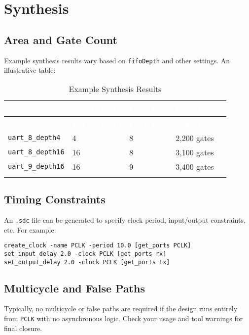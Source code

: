 \section{Synthesis}

\subsection{Area and Gate Count}
Example synthesis results vary based on \texttt{fifoDepth} and other settings. An illustrative table:

\renewcommand*{\arraystretch}{1.3}
\begingroup
\small
{}
\begin{longtable}[H]{
  | p{}
  | p{}
  | p{}
  | p{} |
}
\hline
\rowcolor{gray}
\textcolor{white}{\textbf{Config}} &
\textcolor{white}{\textbf{FIFO Depth}} &
\textcolor{white}{\textbf{Data Bits}} &
\textcolor{white}{\textbf{Gate Count}} \\ 
\hline
\endfirsthead

\hline
\rowcolor{gray}
\textcolor{white}{\textbf{Config}} &
\textcolor{white}{\textbf{FIFO Depth}} &
\textcolor{white}{\textbf{Data Bits}} &
\textcolor{white}{\textbf{Gate Count}} \\ 
\hline
\endhead

\hline
\endfoot

\texttt{uart\_8\_depth4}  & 4  & 8  & 2,200 gates \\ \hline
\texttt{uart\_8\_depth16} & 16 & 8  & 3,100 gates \\ \hline
\texttt{uart\_9\_depth16} & 16 & 9  & 3,400 gates \\ \hline

\caption{Example Synthesis Results}
\end{longtable}
\endgroup

\subsection{Timing Constraints}
An \texttt{.sdc} file can be generated to specify clock period, input/output constraints, etc. For example:
\begin{verbatim}
create_clock -name PCLK -period 10.0 [get_ports PCLK]
set_input_delay 2.0 -clock PCLK [get_ports rx]
set_output_delay 2.0 -clock PCLK [get_ports tx]
\end{verbatim}

\subsection{Multicycle and False Paths}
Typically, no multicycle or false paths are required if the design runs entirely from \texttt{PCLK} with no asynchronous logic. Check your usage and tool warnings for final closure.
